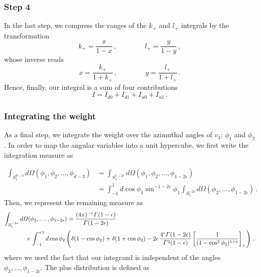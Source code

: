 \documentclass[a4paper,11pt]{article}
\newcommand{\kp}{k_+}
\newcommand{\lp}{l_+}
\numberwithin{equation}{section}
\begin{document}
\subsubsection*{Step 4}

In the last step, we compress the ranges of the $\kp$ and $\lp$ integrals by the
transformation
%
\begin{equation}
  \kp = \frac{x}{1-x}\,, 
  \qquad \qquad
  \lp = \frac{y}{1-y}\,, 
\end{equation}
%
whose inverse reads
\begin{equation}
  x = \frac{\kp}{1+\kp}\,, 
  \qquad \qquad
  y = \frac{\lp}{1+\lp}\,.
\end{equation}
%
Hence, finally, our integral is a sum of four contributions
%
\begin{equation}
  I = I_{d0} + I_{d1} + I_{u0} + I_{u1}\,.
\end{equation}

\subsubsection{Integrating the weight}

As a final step, we integrate the weight over the azimuthal angles of  $v_3$:
$\phi_1$ and $\phi_2$. In order to map the angular variables into a unit
hypercube, we first write the integration measure as

\begin{align}
  \int_{S_1^{d-3}}\!\!\! d\Omega(\phi_1,\phi_2,\ldots,\phi_{d-3}) 
  & =
  \int_{S_1^{1-2\epsilon}}\!\!\!
  d\Omega(\phi_1,\phi_2,\ldots,\phi_{1-2\epsilon}) 
  \nonumber \\
  & =
  \int_{-1}^1 d\cos\phi_1 \sin^{-1-2\epsilon}\phi_1
  \int_{S_1^{-2\epsilon}}\!\!\! d\Omega(\phi_2,\ldots,\phi_{1-2\epsilon})\,.
\end{align}
%
Then, we represent the remaining measure as~\cite{Czakon:2014oma}
%
%
\begin{align}
  \int_{S_1^{-2\epsilon}} {d}{\Omega}(\phi_2, \ldots, \phi_{1-2\epsilon}) & =
  \frac{(4\pi)^{-\epsilon}\Gamma(1-\epsilon)}{\Gamma(1-2\epsilon)} 
  \\
  &
  \hspace{-70pt}
  \times \int_{-1}^{+1} {d}\cos\phi_2 \left( \delta(1-\cos\phi_2)
  + \delta(1 + \cos\phi_2) - 2 \epsilon \, \frac{4^\epsilon
    \Gamma(1-2\epsilon)}{\Gamma^2(1-\epsilon)} \left[
    \frac{1}{(1-\cos^2\phi_2)^{1+\epsilon}} \right]_+\right)\,,
  \nonumber
\end{align}
%
where we used the fact that our integrand is independent of the angles $\phi_3,
\ldots, \phi_{1-2\epsilon}$. The plus distribution is defined as
\end{document}
